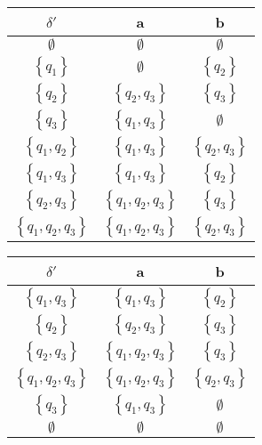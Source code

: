 \documentclass[
	final,
	a4paper,
	oneside,
	parskip=full,
	headings=standardclasses,
	headings=big,
	pointednumbers
]{scrartcl}
\begin{document}
	\begin{minipage}[t]{0.5\textwidth}
        \begin{tabular}[t]{c|cc}
            $ \delta' $                         & a                                 & b                             \\
            \hline
            $ \emptyset $                       & $\emptyset$                       & $\emptyset$                   \\
            $ \left\{ q_1 \right\} $            & $\emptyset$                       & $\left\{ q_2 \right\}$        \\
            $ \left\{ q_2 \right\} $            & $\left\{ q_2, q_3 \right\}$       & $\left\{ q_3 \right\}$        \\
            $ \left\{ q_3 \right\} $            & $\left\{ q_1, q_3 \right\}$       & $\emptyset$                   \\
            $ \left\{ q_1, q_2 \right\} $       & $\left\{ q_1, q_3 \right\}$       & $\left\{ q_2, q_3 \right\}$   \\
            $ \left\{ q_1, q_3 \right\} $       & $\left\{ q_1, q_3 \right\}$       & $\left\{ q_2 \right\}$        \\
            $ \left\{ q_2, q_3 \right\} $       & $\left\{ q_1, q_2, q_3 \right\}$  & $\left\{ q_3 \right\}$        \\
            $ \left\{ q_1, q_2, q_3 \right\} $  & $\left\{ q_1, q_2, q_3 \right\}$  & $\left\{ q_2, q_3 \right\}$
        \end{tabular}
	\end{minipage}
	\begin{minipage}[t]{0.5\textwidth}
        \begin{tabular}[t]{c|cc}
            $ \delta' $                         & a                                 & b                             \\
            \hline
            $ \left\{ q_1, q_3 \right\} $       & $\left\{ q_1, q_3 \right\}$       & $\left\{ q_2 \right\}$        \\
            $ \left\{ q_2 \right\} $            & $\left\{ q_2, q_3 \right\}$       & $\left\{ q_3 \right\}$        \\
            $ \left\{ q_2, q_3 \right\} $       & $\left\{ q_1, q_2, q_3 \right\}$  & $\left\{ q_3 \right\}$        \\
            $ \left\{ q_1, q_2, q_3 \right\} $  & $\left\{ q_1, q_2, q_3 \right\}$  & $\left\{ q_2, q_3 \right\}$   \\
            $ \left\{ q_3 \right\} $            & $\left\{ q_1, q_3 \right\}$       & $\emptyset$                   \\
            $ \emptyset $                       & $\emptyset$                       & $\emptyset$
        \end{tabular}
	\end{minipage}
\end{document}

